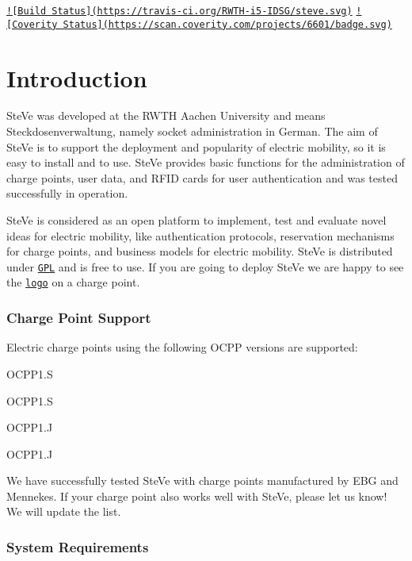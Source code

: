 

\href{https://travis-ci.org/RWTH-i5-IDSG/steve}{\tt !\mbox{[}Build Status\mbox{]}(https\+://travis-\/ci.\+org/\+R\+W\+T\+H-\/i5-\/\+I\+D\+S\+G/steve.\+svg)} \href{https://scan.coverity.com/projects/rwth-i5-idsg-steve}{\tt !\mbox{[}Coverity Status\mbox{]}(https\+://scan.\+coverity.\+com/projects/6601/badge.\+svg)}

\section*{Introduction}

Ste\+Ve was developed at the R\+W\+T\+H Aachen University and means Steckdosenverwaltung, namely socket administration in German. The aim of Ste\+Ve is to support the deployment and popularity of electric mobility, so it is easy to install and to use. Ste\+Ve provides basic functions for the administration of charge points, user data, and R\+F\+I\+D cards for user authentication and was tested successfully in operation.

Ste\+Ve is considered as an open platform to implement, test and evaluate novel ideas for electric mobility, like authentication protocols, reservation mechanisms for charge points, and business models for electric mobility. Ste\+Ve is distributed under \href{LICENSE.txt}{\tt G\+P\+L} and is free to use. If you are going to deploy Ste\+Ve we are happy to see the \href{website/logo/managed-by-steve.pdf}{\tt logo} on a charge point.

\subsubsection*{Charge Point Support}

Electric charge points using the following O\+C\+P\+P versions are supported\+:


\begin{DoxyItemize}
\item O\+C\+P\+P1.\+S
\item O\+C\+P\+P1.\+S
\item O\+C\+P\+P1.\+J
\item O\+C\+P\+P1.\+J
\end{DoxyItemize}

We have successfully tested Ste\+Ve with charge points manufactured by E\+B\+G and Mennekes. If your charge point also works well with Ste\+Ve, please let us know! We will update the list.

\subsubsection*{System Requirements}

